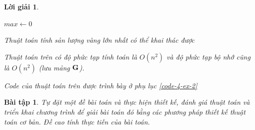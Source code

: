 \documentclass[14pt, a4paper]{article}
\theoremstyle{sltheorem}
\newtheorem{baitap}{Bài tập}
\theoremstyle{soltheorem}
\newtheorem*{loigiai}{Lời giải}
\begin{document}
\begin{loigiai}
\begin{itemize} [label={$-$}]
\begin{algorithm}[h!]
            $max \gets 0$\;
            \;
            \caption{Thuật toán tính sản lượng vàng lớn nhất có thể khai thác được}
        \end{algorithm}

        Thuật toán trên có độ phức tạp tính toán là $O(n^2)$ và độ phức tạp bộ nhớ cũng là $O(n^2)$ (lưu mảng $\bold{G}$).

        Code của thuật toán trên được trình bày ở phụ lục \ref{code-4-ex-2}


    \end{itemize}

    \end{loigiai}

    \begin{baitap}
        Tự đặt một đề bài toán và thực hiện thiết kế, đánh giá thuật toán và triển khai
        chương trình để giải bài toán đó bằng các phương pháp thiết kế thuật toán cơ bản.
        Đề cao tính thực tiễn của bài toán.

    \end{baitap}
\end{document}
